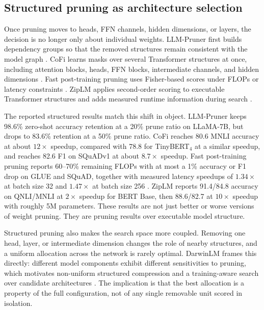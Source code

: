 \subsection{Structured pruning as architecture selection}
\label{subsec:structured_pruning_architecture_selection}

Once pruning moves to heads, FFN channels, hidden dimensions, or layers, the decision is no longer only about individual weights. LLM-Pruner first builds dependency groups so that the removed structures remain consistent with the model graph \cite{ma2023llmpruner}. CoFi learns masks over several Transformer structures at once, including attention blocks, heads, FFN blocks, intermediate channels, and hidden dimensions \cite{xia2022cofi}. Fast post-training pruning uses Fisher-based scores under FLOPs or latency constraints \cite{kwon2022fast}. ZipLM applies second-order scoring to executable Transformer structures and adds measured runtime information during search \cite{kurtic2023ziplm}.

The reported structured results match this shift in object. LLM-Pruner keeps 98.6\% zero-shot accuracy retention at a 20\% prune ratio on LLaMA-7B, but drops to 83.6\% retention at a 50\% prune ratio. CoFi reaches 80.6 MNLI accuracy at about $12\times$ speedup, compared with 78.8 for TinyBERT$_4$ at a similar speedup, and reaches 82.6 F1 on SQuADv1 at about $8.7\times$ speedup. Fast post-training pruning reports 60--70\% remaining FLOPs with at most a 1\% accuracy or F1 drop on GLUE and SQuAD, together with measured latency speedups of $1.34\times$ at batch size 32 and $1.47\times$ at batch size 256 \cite{kwon2022fast}. ZipLM reports 91.4/84.8 accuracy on QNLI/MNLI at $2\times$ speedup for BERT Base, then 88.6/82.7 at $10\times$ speedup with roughly 5M parameters. These results are not just better or worse versions of weight pruning. They are pruning results over executable model structure.

Structured pruning also makes the search space more coupled. Removing one head, layer, or intermediate dimension changes the role of nearby structures, and a uniform allocation across the network is rarely optimal. DarwinLM frames this directly: different model components exhibit different sensitivities to pruning, which motivates non-uniform structured compression and a training-aware search over candidate architectures \cite{darwinlm2025}. The implication is that the best allocation is a property of the full configuration, not of any single removable unit scored in isolation.

